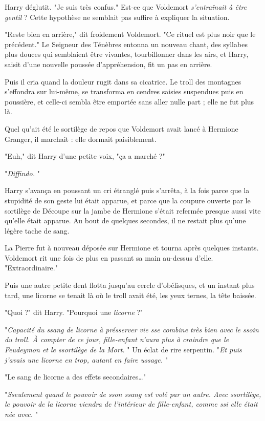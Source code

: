 Harry déglutit. "Je suis très confus." Est-ce que Voldemort \emph{s'entraînait à être gentil}  ? Cette hypothèse ne semblait pas suffire à expliquer la situation.

"Reste bien en arrière," dit froidement Voldemort. "Ce rituel est plus noir que le précédent." Le Seigneur des Ténèbres entonna un nouveau chant, des syllabes plus douces qui semblaient être vivantes, tourbillonner dans les airs, et Harry, saisit d'une nouvelle poussée d'appréhension, fit un pas en arrière.

Puis il cria quand la douleur rugit dans sa cicatrice. Le troll des montagnes s'effondra sur lui-même, se transforma en cendres saisies suspendues puis en poussière, et celle-ci sembla être emportée sans aller nulle part ; elle ne fut plus là.

Quel qu'ait été le sortilège de repos que Voldemort avait lancé à Hermione Granger, il marchait : elle dormait paisiblement.

"Euh," dit Harry d'une petite voix, "ça a marché ?"

"\emph{Diffindo.} "

Harry s'avança en poussant un cri étranglé puis s'arrêta, à la fois parce que la stupidité de son geste lui était apparue, et parce que la coupure ouverte par le sortilège de Découpe sur la jambe de Hermione s'était refermée presque aussi vite qu'elle était apparue. Au bout de quelques secondes, il ne restait plus qu'une légère tache de sang.

La Pierre fut à nouveau déposée sur Hermione et tourna après quelques instants. Voldemort rit une fois de plus en passant sa main au-dessus d'elle. "Extraordinaire."

Puis une autre petite dent flotta jusqu'au cercle d'obélisques, et un instant plus tard, une licorne se tenait là où le troll avait été, les yeux ternes, la tête baissée.

"Quoi ?" dit Harry. "Pourquoi une \emph{licorne}  ?"

"\emph{Capacité du ssang de licorne à présserver vie sse combine très bien avec le ssoin du troll. À compter de ce jour, fille-enfant n'aura plus à craindre que le Feudeymon et le ssortilège de la Mort.} " Un éclat de rire serpentin. "\emph{Et puis j'avais une licorne en trop, autant en faire ussage.} "

"Le sang de licorne a des effets secondaires…"

"\emph{Sseulement quand le pouvoir de sson ssang est volé par un autre. Avec ssortilège, le pouvoir de la licorne viendra de l'intérieur de fille-enfant, comme ssi elle était née avec.} "

